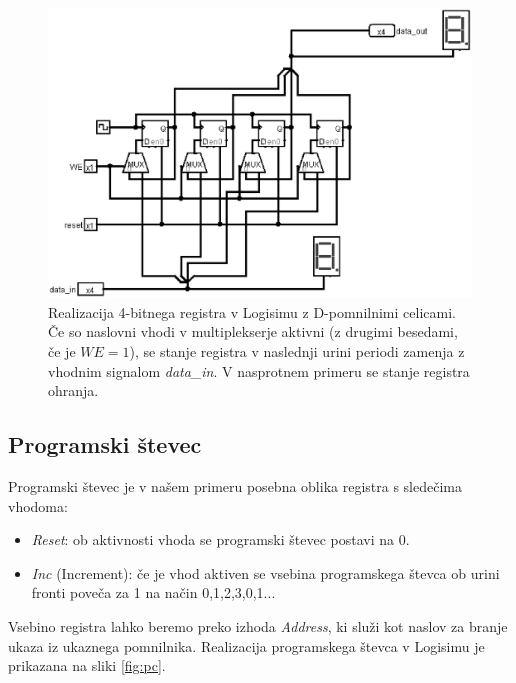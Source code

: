 \begin{figure}[htbf]%
\begin{center}
\includegraphics[width=0.75\columnwidth]{procesor/img/reg_4bit}%
\caption{Realizacija 4-bitnega registra v Logisimu z D-pomnilnimi celicami. Če so naslovni vhodi v multiplekserje aktivni (z drugimi besedami, če je $WE=1$), se stanje registra v naslednji urini periodi zamenja z vhodnim signalom \emph{data\_in}. V nasprotnem primeru se stanje registra ohranja.}%
\label{fig:reg_4bit}%
\end{center}
\end{figure}

\subsection{Programski števec}
Programski števec je v našem primeru posebna oblika registra s sledečima vhodoma:
\begin{itemize}
\item \emph{Reset}: ob aktivnosti vhoda se programski števec postavi na 0.
\item \emph{Inc} (Increment): če je vhod aktiven se vsebina programskega števca ob urini fronti poveča za 1 na način 0,1,2,3,0,1... 
\end{itemize}
Vsebino registra lahko beremo preko izhoda \emph{Address}, ki služi kot naslov za branje ukaza iz ukaznega pomnilnika. Realizacija programskega števca v Logisimu je prikazana na sliki \ref{fig:pc}.

